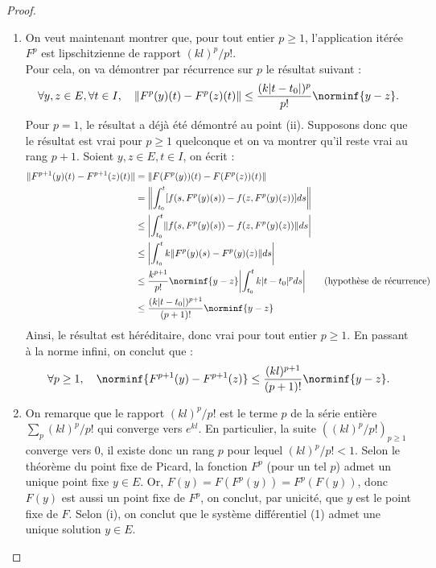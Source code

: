 \begin{proof}
\begin{enumerate}[label=(\roman*)]
\item
On veut maintenant montrer que, pour tout entier $p \geq 1$, l'application itérée $F^p$ est lipschitzienne de rapport $(kl)^p/p!$. \\
Pour cela, on va démontrer par récurrence sur $p$ le résultat suivant :
\[ \forall y, z \in E, \forall t \in I, \quad \norm{F^p(y)(t) - F^p(z)(t)} \leq \dfrac{(k\abs{t-t_0})^p}{p!} \norminf{y-z} . \]
Pour $p=1$, le résultat a déjà été démontré au point (ii). Supposons donc que le résultat est vrai pour $p \geq 1$ quelconque
et on va montrer qu'il reste vrai au rang $p+1$. Soient $y, z \in E, t \in I$, on écrit :
\begin{align*}
\norm{ F^{p+1}(y)(t) - F^{p+1}(z)(t) } & = \norm{ F(F^p(y))(t) - F(F^p(z))(t) } \\
& = \norm*{ \int_{t_0}^t [ f(s, F^p(y)(s)) - f(z, F^p(y)(z)) ] ds } \\
& \leq \abs*{ \int_{t_0}^t \norm*{ f(s, F^p(y)(s)) - f(z, F^p(y)(z)) } ds } \\
& \leq \abs*{ \int_{t_0}^t k \norm*{ F^p(y)(s) - F^p(y)(z) } ds } \\
& \leq \dfrac{k^{p+1}}{p!} \norminf{y-z} \abs*{ \int_{t_0}^t k \abs{t-t_0}^p ds } \qquad \text{(hypothèse de récurrence)} \\
& \leq \dfrac{(k\abs{t-t_0})^{p+1}}{(p+1)!} \norminf{y-z}
\end{align*}
Ainsi, le résultat est héréditaire, donc vrai pour tout entier $p \geq 1$. En passant à la norme infini, on conclut que :
\[ \forall p \geq 1, \quad \norminf{ F^{p+1}(y) - F^{p+1}(z) } \leq \dfrac{(kl)^{p+1}}{(p+1)!} \norminf{y-z} . \]

\item 
On remarque que le rapport $(kl)^p/p!$ est le terme $p$ de la série entière $\sum_p (kl)^p/p!$ qui converge vers $e^{kl}$. 
En particulier, la suite $((kl)^p/p!)_{p \geq 1}$ converge vers 0, il existe donc un rang $p$ pour lequel $(kl)^p/p! < 1$.
Selon le théorème du point fixe de Picard, la fonction $F^p$ (pour un tel $p$) admet un unique point fixe $y \in E$.
Or, $F(y) = F(F^p(y)) = F^p(F(y))$, donc $F(y)$ est aussi un point fixe de $F^p$, on conclut, par unicité, que $y$ est le point fixe de $F$.
Selon (i), on conclut que le système différentiel (1) admet une unique solution $y \in E$.
\end{enumerate}


\end{proof}
